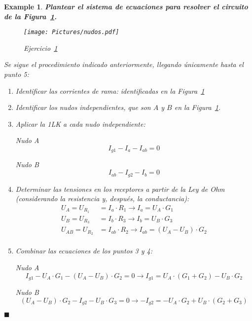 \documentclass[11pt]{book} %
\numberwithin{dummy}{section}
\theoremstyle{ocrenumbox}
\theoremstyle{blacknumex}
\newtheorem{exampleT}{Example}[chapter]
\theoremstyle{blacknumbox}
\theoremstyle{ocrenum}
\newenvironment{example}{\begin{exampleT}}{\hfill{\tiny\ensuremath{\blacksquare}}\end{exampleT}}
\newlength\esp
\begin{document}
	\vspace{4mm}
	\begin{example}\label{ej.1-6}
		\textbf{Plantear el sistema de ecuaciones para resolver el circuito de la Figura~\ref{fig.nudos}.}
		\begin{figure}[htbp]
			\centering
			\texttt{[image: Pictures/nudos.pdf]}
			\caption{Ejercicio~\ref{ej.1-6}}
			\label{fig.nudos}
		\end{figure}
		
		Se sigue el procedimiento indicado anteriormente, llegando únicamente hasta el punto 5: 
		
		\begin{enumerate}
			\item Identificar las corrientes de rama: identificadas en la Figura~\ref{fig.nudos}
			\item Identificar los nudos independientes, que son $A$ y $B$ en la Figura~\ref{fig.nudos}.
			\item Aplicar la 1LK a cada nudo independiente:
			
			Nudo A
			\begin{equation*}
				I_{g1} - I_a - I_{ab} = 0
			\end{equation*}
			
			Nudo B
			\begin{equation*}
				I_{ab} - I_{g2} - I_b = 0
			\end{equation*}
			\item Determinar las tensiones en los receptores a partir de la Ley de Ohm (considerando la resistencia y, después, la conductancia):
			\begin{align*}
				U_A = U_{R_1} &= I_a \cdot R_1\rightarrow I_a=U_A\cdot G_1\\
				U_B = U_{R_3} &= I_b \cdot R_3\rightarrow I_b=U_B\cdot G_3\\
				U_{AB}=U_{R_2} &= I_{ab} \cdot R_2\rightarrow I_{ab}=(U_A-U_B)\cdot G_2\\
			\end{align*}
			\item Combinar las ecuaciones de los puntos 3 y 4:
			
			Nudo A
			\begin{equation*}
				I_{g1} - U_A \cdot G_1 - (U_A - U_B) \cdot G_2 = 0\rightarrow I_{g1} = U_A \cdot (G_1 + G_2) - U_B \cdot G_2 
			\end{equation*}
			
			Nudo B
			\begin{equation*}
				(U_A - U_B) \cdot G_2 - I_{g2} - U_B \cdot G_3 = 0 \rightarrow  - I_{g2} = - U_A \cdot G_2 + U_B \cdot (G_2 + G_3)
			\end{equation*}
			

\end{enumerate}
\end{example}
\end{document}
